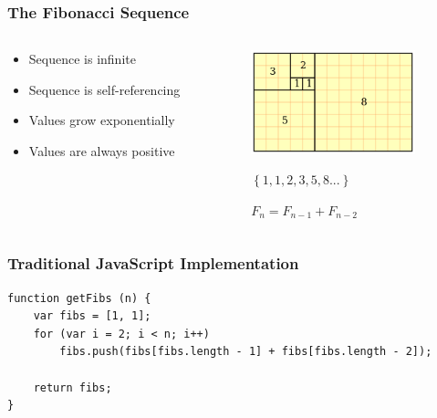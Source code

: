 \documentclass{beamer}
\begin{document}
    \begin{frame}
        \frametitle{The Fibonacci Sequence}

        \begin{columns}[c]
            \begin{column}[T]{5cm}
                \begin{itemize}
                    \item Sequence is infinite
                    \item Sequence is self-referencing
                    \item Values grow exponentially
                    \item Values are always positive
                \end{itemize}
            \end{column}
            \begin{column}[T]{5cm}
                \begin{figure}
                    \centering
                    \includegraphics[height=3cm]{./images/FibonacciBlocks.png}
                \end{figure}

                \begin{figure}
                    \centering
                    \begin{math}
                        \left\{1,1,2,3,5,8...\right\}
                    \end{math}
                \end{figure}
               
                \begin{figure}
                    \centering
                    \begin{math}
                        F_{n} = F_{n-1} + F_{n-2}
                    \end{math}
                \end{figure}
            \end{column}
        \end{columns}
    \end{frame}

    \lstset{language=JavaScript}
    \begin{frame}[fragile=singleslide]
        \frametitle{Traditional JavaScript Implementation}

        \begin{lstlisting}
function getFibs (n) {
    var fibs = [1, 1];
    for (var i = 2; i < n; i++) 
        fibs.push(fibs[fibs.length - 1] + fibs[fibs.length - 2]);

    return fibs;
}
        \end{lstlisting}
    \end{frame}
\end{document}
